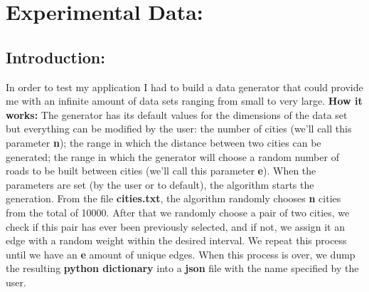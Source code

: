 \documentclass[12pt]{article}
\begin{document}
\section{Experimental Data:}
\subsection{Introduction:}
In order to test my application I had to build a data generator that could provide me with an infinite amount of data sets ranging from small to very large.
\newline\newline
\textbf{How it works:}
\newline
The generator has its default values for the dimensions of the data set but everything can be modified by the user: the number of cities (we'll call this parameter \textbf{n}); the range in which the distance between two cities can be generated; the range in which the generator will choose a random number of roads to be built between cities (we'll call this parameter \textbf{e}).
\newline\newline
When the parameters are set (by the user or to default), the algorithm starts the generation. From the file \textbf{cities.txt}, the algorithm randomly chooses \textbf{n} cities from the total of 10000. After that we randomly choose a pair of two cities, we check if this pair has ever been previously selected, and if not, we assign it an edge with a random weight within the desired interval. We repeat this process until we have an \textbf{e} amount of unique edges.\newline
\newline
When this process is over, we dump the resulting \textbf{python dictionary} into a \textbf{json} file with the name specified by the user.
\newpage
\end{document}
